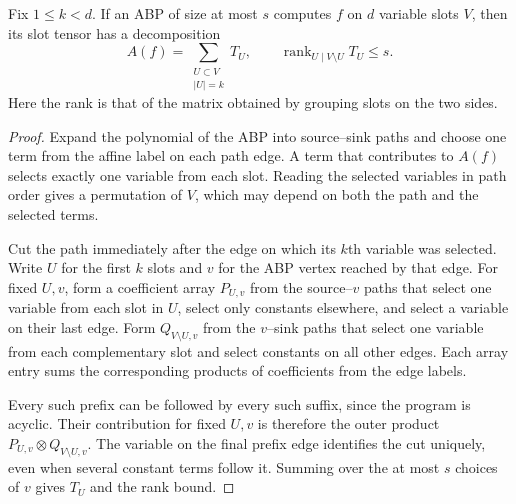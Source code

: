 \begin{lemma}\label{lem:prefix}
Fix $1\le k<d$. If an ABP of size at most $s$ computes $f$ on $d$
variable slots $V$, then its slot tensor has a decomposition
\[
             A(f)=\sum_{\substack{U\subset V\\ |U|=k}} T_U ,
             \qquad \operatorname{rank}_{U\mid V\setminus U} T_U\le s .
\]
Here the rank is that of the matrix obtained by grouping slots on the two sides.
\end{lemma}
\begin{proof}
Expand the polynomial of the ABP into source--sink paths and choose
one term from the affine label on each path edge. A term that
contributes to $A(f)$ selects exactly one variable from each slot.
Reading the selected variables in path order gives a permutation of
$V$, which may depend on both the path and the selected terms.

Cut the path immediately after the edge on which its $k$th variable
was selected. Write $U$ for the first $k$ slots and $v$ for the ABP
vertex reached by that edge. For fixed $U,v$, form a coefficient array
$P_{U,v}$ from the source--$v$ paths that select one variable from each
slot in $U$, select only constants elsewhere, and select a variable on
their last edge. Form $Q_{V\setminus U,v}$ from the $v$--sink paths
that select one variable from each complementary slot and select
constants on all other edges. Each array entry sums the corresponding
products of coefficients from the edge labels.

Every such prefix can be followed by every such suffix, since the
program is acyclic. Their contribution for fixed $U,v$ is therefore the
outer product $P_{U,v}\otimes Q_{V\setminus U,v}$. The variable on the
final prefix edge identifies the cut uniquely, even when several
constant terms follow it. Summing over the at most $s$ choices of $v$
gives $T_U$ and the rank bound.
\end{proof}

